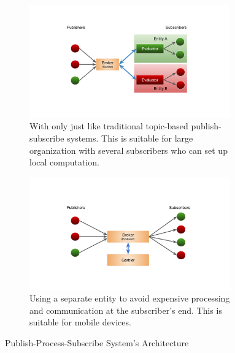 \begin{figure}[h]
	\centering
	\begin{subfigure}{0.45\textwidth}
		\centering
		\includegraphics[width=0.95\textwidth]{figures/pps-local}
		\caption{With only \broker just like traditional topic-based publish-subscribe systems. This is suitable for large organization with several subscribers who can set up local computation.}
		\label{fig:pps-local}
	\end{subfigure}
	\begin{subfigure}{0.45\textwidth}
		\centering
		\includegraphics[width=0.95\textwidth]{figures/pps-out}
		\caption{Using a separate entity to avoid expensive processing and communication at the subscriber's end. This is suitable for mobile devices.}
		\label{fig:pps-out}
	\end{subfigure}
	\caption{Publish-Process-Subscribe System's Architecture}
	\label{fig:pps}
\end{figure}

